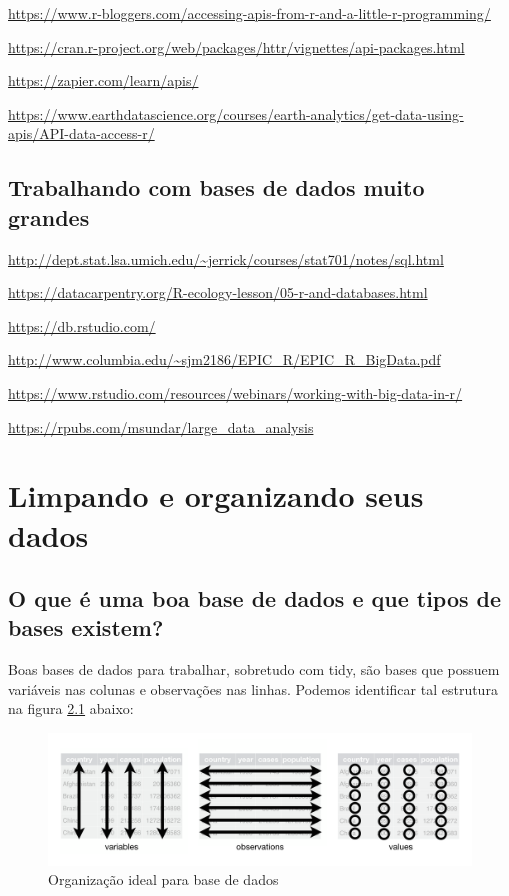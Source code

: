 \documentclass[12pt,a4paper,oneside]{erdc}
\begin{document}
\url{https://www.r-bloggers.com/accessing-apis-from-r-and-a-little-r-programming/}

\url{https://cran.r-project.org/web/packages/httr/vignettes/api-packages.html}

\url{https://zapier.com/learn/apis/}

\url{https://www.earthdatascience.org/courses/earth-analytics/get-data-using-apis/API-data-access-r/}



\section{Trabalhando com bases de dados muito grandes}

\url{http://dept.stat.lsa.umich.edu/~jerrick/courses/stat701/notes/sql.html}

\url{https://datacarpentry.org/R-ecology-lesson/05-r-and-databases.html}

\url{https://db.rstudio.com/}

\url{http://www.columbia.edu/~sjm2186/EPIC_R/EPIC_R_BigData.pdf}

\url{https://www.rstudio.com/resources/webinars/working-with-big-data-in-r/}

\url{https://rpubs.com/msundar/large_data_analysis}









%
%
%


\chapter{Limpando e organizando seus dados}

	\section{O que é uma boa base de dados e que tipos de bases existem?}
	Boas bases de dados para trabalhar, sobretudo com tidy, são bases que possuem variáveis nas colunas e observações nas linhas. 
	Podemos identificar tal estrutura na figura \ref{fig:f03-01}  abaixo:
	
\begin{figure}[htpb!]
	\centering
	\includegraphics[width=\linewidth]{../figs/BP_Curso_TecComp_00_2019_f03-01}
	\caption{Organização ideal para base de dados}
	\label{fig:f03-01}
\end{figure}
\end{document}
